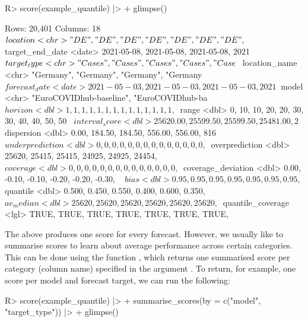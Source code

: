 \documentclass[
]{jss}
\begin{document}
\begin{CodeChunk}
\begin{CodeInput}
R> score(example_quantile) |>
+   glimpse()
\end{CodeInput}
\begin{CodeOutput}
Rows: 20,401
Columns: 18
$ location           <chr> "DE", "DE", "DE", "DE", "DE", "DE", "DE",~
$ target_end_date    <date> 2021-05-08, 2021-05-08, 2021-05-08, 2021~
$ target_type        <chr> "Cases", "Cases", "Cases", "Cases", "Case~
$ location_name      <chr> "Germany", "Germany", "Germany", "Germany~
$ forecast_date      <date> 2021-05-03, 2021-05-03, 2021-05-03, 2021~
$ model              <chr> "EuroCOVIDhub-baseline", "EuroCOVIDhub-ba~
$ horizon            <dbl> 1, 1, 1, 1, 1, 1, 1, 1, 1, 1, 1, 1, 1, 1,~
$ range              <dbl> 0, 10, 10, 20, 20, 30, 30, 40, 40, 50, 50~
$ interval_score     <dbl> 25620.00, 25599.50, 25599.50, 25481.00, 2~
$ dispersion         <dbl> 0.00, 184.50, 184.50, 556.00, 556.00, 816~
$ underprediction    <dbl> 0, 0, 0, 0, 0, 0, 0, 0, 0, 0, 0, 0, 0, 0,~
$ overprediction     <dbl> 25620, 25415, 25415, 24925, 24925, 24454,~
$ coverage           <dbl> 0, 0, 0, 0, 0, 0, 0, 0, 0, 0, 0, 0, 0, 0,~
$ coverage_deviation <dbl> 0.00, -0.10, -0.10, -0.20, -0.20, -0.30, ~
$ bias               <dbl> 0.95, 0.95, 0.95, 0.95, 0.95, 0.95, 0.95,~
$ quantile           <dbl> 0.500, 0.450, 0.550, 0.400, 0.600, 0.350,~
$ ae_median          <dbl> 25620, 25620, 25620, 25620, 25620, 25620,~
$ quantile_coverage  <lgl> TRUE, TRUE, TRUE, TRUE, TRUE, TRUE, TRUE,~
\end{CodeOutput}
\end{CodeChunk}

The above produces one score for every forecast. However, we usually
like to summarise scores to learn about average performance across
certain categories. This can be done using the function
, which returns one summarised score per
category (column name) specified in the argument . To return,
for example, one score per model and forecast target, we can run the
following:

\begin{CodeChunk}
\begin{CodeInput}
R> score(example_quantile) |>
+   summarise_scores(by = c("model", "target_type")) |>
+   glimpse()
\end{CodeInput}
\end{CodeChunk}
\end{document}
